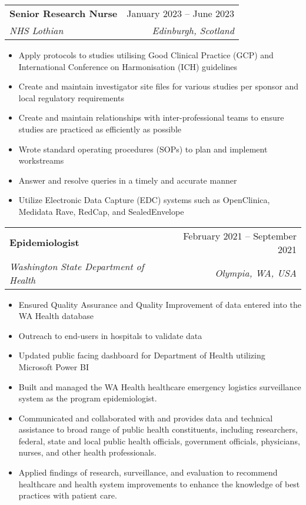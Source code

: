 \documentclass[letterpaper,11pt]{article}
\makeatletter
\newcommand{\resumeItem}[1]{
  \item\small{
    {#1 \vspace{-2pt}}
  }
}
\newcommand{\resumeSubheading}[4]{
  \vspace{-2pt}\item
    \begin{tabular*}{0.97\textwidth}[t]{l@{\extracolsep{\fill}}r}
      \textbf{#1} & #2 \\
      \textit{\small#3} & \textit{\small #4} \\
    \end{tabular*}\vspace{-7pt}
}
\newcommand{\resumeSubSubheading}[2]{
    \item
    \begin{tabular*}{0.97\textwidth}{l@{\extracolsep{\fill}}r}
      \textit{\small#1} & \textit{\small #2} \\
    \end{tabular*}\vspace{-7pt}
}
\newcommand{\resumeSubHeadingListEnd}{\end{itemize}}
\newcommand{\resumeItemListStart}{\begin{itemize}}
\newcommand{\resumeItemListEnd}{\end{itemize}\vspace{-5pt}}
\makeatother
\begin{document}

    \resumeSubheading
      {Senior Research Nurse}{January 2023 -- June 2023}
      {NHS Lothian}{Edinburgh, Scotland}
      \resumeItemListStart
        \resumeItem{Apply protocols to studies utilising Good Clinical Practice (GCP) and International Conference on Harmonisation (ICH) guidelines}
        \resumeItem{Create and maintain investigator site files for various studies per sponsor and local regulatory requirements}
        \resumeItem{Create and maintain relationships with inter-professional teams to ensure studies are practiced as efficiently as possible}
        \resumeItem{Wrote standard operating procedures (SOPs) to plan and implement workstreams}
        \resumeItem{Answer and resolve queries in a timely and accurate manner}
        \resumeItem{Utilize Electronic Data Capture (EDC) systems such as OpenClinica, Medidata Rave, RedCap, and SealedEnvelope}
    \resumeItemListEnd

    \resumeSubheading
      {Epidemiologist}{February 2021 -- September 2021}
      {Washington State Department of Health}{Olympia, WA, USA}
      \resumeItemListStart
        \resumeItem{Ensured Quality Assurance and Quality Improvement of data entered into the WA Health database}
        \resumeItem{Outreach to end-users in hospitals to validate data}
        \resumeItem{Updated public facing dashboard for Department of Health utilizing Microsoft Power BI}
        \resumeItem{Built and managed the WA Health healthcare emergency logistics surveillance system as the program epidemiologist.}
        \resumeItem{Communicated and collaborated with and provides data and technical assistance to broad range of public health constituents, including researchers, federal, state and local public health officials, government officials, physicians, nurses, and other health professionals. }
        \resumeItem{Applied findings of research, surveillance, and evaluation to recommend healthcare and health system improvements to enhance the knowledge of best practices with patient care.}
      \resumeItemListEnd
\end{document}
